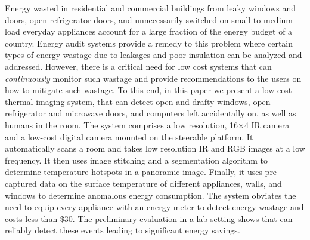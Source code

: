 Energy wasted in residential and commercial buildings from leaky windows and doors, open refrigerator doors, and unnecessarily switched-on small to medium load everyday appliances account for a large fraction of the energy budget of a country. Energy audit systems provide a remedy to this problem where certain types of energy wastage due to leakages and poor insulation can be analyzed and addressed. However, there is a critical need for low cost systems that can {\em continuously} monitor such wastage and provide recommendations to the users on how to mitigate such wastage. To this end, in this paper we present a low cost thermal imaging system, {\IRLeak} that can detect open and drafty windows, open refrigerator and microwave doors, and computers left accidentally on, as well as humans in the room. The system comprises a low resolution, 16$\times$4 IR camera and a low-cost digital camera mounted on the steerable platform. It automatically scans a room and takes low resolution IR and RGB images at a low frequency. It then uses image stitching and a segmentation algorithm to determine temperature hotspots in a panoramic image. Finally, it uses pre-captured data on the surface temperature of different appliances, walls, and windows to determine anomalous energy consumption. The system obviates the need to equip every appliance with an energy meter to detect energy wastage and costs less than \$30. The preliminary evaluation in a lab setting shows that {\IRLeak} can reliably detect these events leading to significant energy savings.

